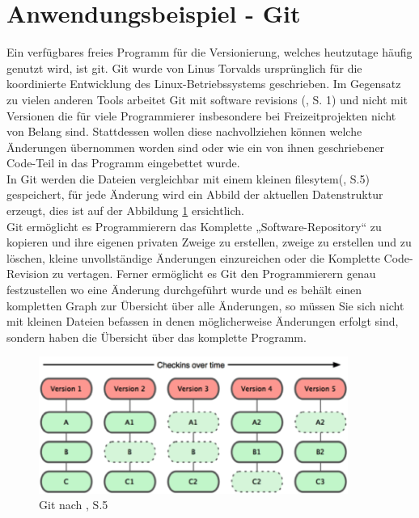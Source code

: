 \section{Anwendungsbeispiel - Git}
Ein verfügbares freies Programm für die Versionierung, welches heutzutage häufig genutzt wird, ist git. Git wurde von Linus Torvalds ursprünglich für die koordinierte Entwicklung des Linux-Betriebssystems geschrieben. Im Gegensatz zu vielen anderen Tools arbeitet Git mit \Gu software revisions \Go (\cite{git_tool}, S. 1) und nicht mit Versionen die für viele Programmierer insbesondere bei Freizeitprojekten nicht von Belang sind. Stattdessen wollen diese nachvollziehen können welche Änderungen übernommen worden sind oder wie ein von ihnen geschriebener Code-Teil in das Programm eingebettet wurde.
\\
In Git werden die Dateien vergleichbar mit einem kleinen \Gu filesytem\Go (\cite{git_scm}, S.5) gespeichert, für jede Änderung wird ein Abbild der aktuellen Datenstruktur erzeugt, dies ist auf der  Abbildung \ref{fig:git} ersichtlich.
\\
Git ermöglicht es Programmierern das Komplette „Software-Repository“ zu kopieren und ihre eigenen privaten Zweige zu erstellen, zweige zu erstellen und zu löschen, kleine unvollständige Änderungen einzureichen oder die Komplette Code-Revision zu vertagen. Ferner ermöglicht es Git den Programmierern genau festzustellen wo eine Änderung durchgeführt wurde und es behält einen kompletten Graph zur Übersicht über alle Änderungen, so müssen Sie sich nicht mit kleinen Dateien befassen in denen möglicherweise Änderungen erfolgt sind, sondern haben die Übersicht über das komplette Programm. 
\begin{figure}[H]
	\includegraphics[width=0.9\textwidth]{img/git.png}
	\caption{Git nach \cite{git_scm}, S.5}
	\label{fig:git}
\end{figure}

